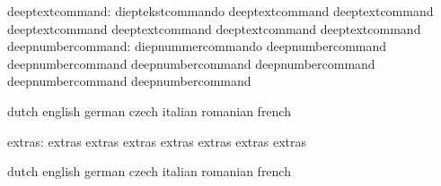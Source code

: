           deeptextcommand: dieptekstcommando         deeptextcommand
                           deeptextcommand           deeptextcommand
                           deeptextcommand           deeptextcommand
                           deeptextcommand
        deepnumbercommand: diepnummercommando        deepnumbercommand
                           deepnumbercommand         deepnumbercommand
                           deepnumbercommand         deepnumbercommand
                           deepnumbercommand

\stopconstants


\startconstants            dutch                     english
                           german                    czech
                           italian                   romanian
                           french

                   extras: extras                    extras
                           extras                    extras
                           extras                    extras
                           extras

\stopconstants




\startvariables            dutch                     english
                           german                    czech
                           italian                   romanian
                           french


